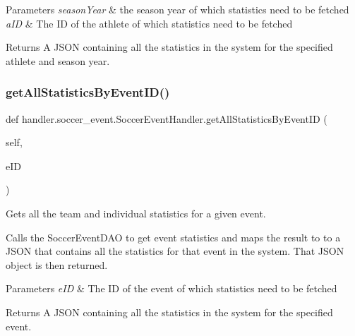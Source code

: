 \begin{DoxyParams}{Parameters}
{\em season\+Year} & the season year of which statistics need to be fetched \\
\hline
{\em a\+ID} & The ID of the athlete of which statistics need to be fetched\\
\hline
\end{DoxyParams}
\begin{DoxyReturn}{Returns}
A J\+S\+ON containing all the statistics in the system for the specified athlete and season year. 
\end{DoxyReturn}
\mbox{\label{classhandler_1_1soccer__event_1_1_soccer_event_handler_ab6bd0417ab481b45ecab9b2d2c9e738b}} 
\subsubsection{\texorpdfstring{get\+All\+Statistics\+By\+Event\+I\+D()}{getAllStatisticsByEventID()}}
{\footnotesize\ttfamily def handler.\+soccer\+\_\+event.\+Soccer\+Event\+Handler.\+get\+All\+Statistics\+By\+Event\+ID (\begin{DoxyParamCaption}\item[{}]{self,  }\item[{}]{e\+ID }\end{DoxyParamCaption})}



Gets all the team and individual statistics for a given event. 

Calls the Soccer\+Event\+D\+AO to get event statistics and maps the result to to a J\+S\+ON that contains all the statistics for that event in the system. That J\+S\+ON object is then returned.


\begin{DoxyParams}{Parameters}
{\em e\+ID} & The ID of the event of which statistics need to be fetched\\
\hline
\end{DoxyParams}
\begin{DoxyReturn}{Returns}
A J\+S\+ON containing all the statistics in the system for the specified event. 
\end{DoxyReturn}
\mbox{\label{classhandler_1_1soccer__event_1_1_soccer_event_handler_adcf08513902f4ef82aab9c5bf5986663}} 
